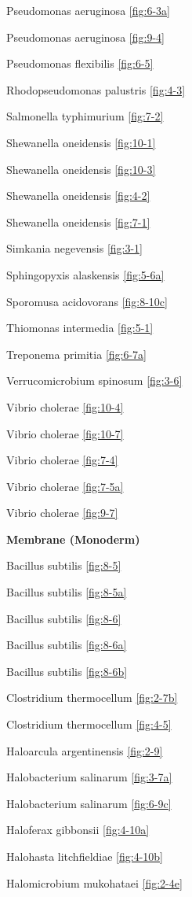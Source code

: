 \documentclass[]{tufte-book}
\begin{document}
Pseudomonas aeruginosa \ref{fig:6-3a}

Pseudomonas aeruginosa \ref{fig:9-4}

Pseudomonas flexibilis \ref{fig:6-5}

Rhodopseudomonas palustris \ref{fig:4-3}

Salmonella typhimurium \ref{fig:7-2}

Shewanella oneidensis \ref{fig:10-1}

Shewanella oneidensis \ref{fig:10-3}

Shewanella oneidensis \ref{fig:4-2}

Shewanella oneidensis \ref{fig:7-1}

Simkania negevensis \ref{fig:3-1}

Sphingopyxis alaskensis \ref{fig:5-6a}

Sporomusa acidovorans \ref{fig:8-10c}

Thiomonas intermedia \ref{fig:5-1}

Treponema primitia \ref{fig:6-7a}

Verrucomicrobium spinosum \ref{fig:3-6}

Vibrio cholerae \ref{fig:10-4}

Vibrio cholerae \ref{fig:10-7}

Vibrio cholerae \ref{fig:7-4}

Vibrio cholerae \ref{fig:7-5a}

Vibrio cholerae \ref{fig:9-7}

\textbf{Membrane (Monoderm)}

Bacillus subtilis \ref{fig:8-5}

Bacillus subtilis \ref{fig:8-5a}

Bacillus subtilis \ref{fig:8-6}

Bacillus subtilis \ref{fig:8-6a}

Bacillus subtilis \ref{fig:8-6b}

Clostridium thermocellum \ref{fig:2-7b}

Clostridium thermocellum \ref{fig:4-5}

Haloarcula argentinensis \ref{fig:2-9}

Halobacterium salinarum \ref{fig:3-7a}

Halobacterium salinarum \ref{fig:6-9c}

Haloferax gibbonsii \ref{fig:4-10a}

Halohasta litchfieldiae \ref{fig:4-10b}

Halomicrobium mukohataei \ref{fig:2-4e}
\end{document}
